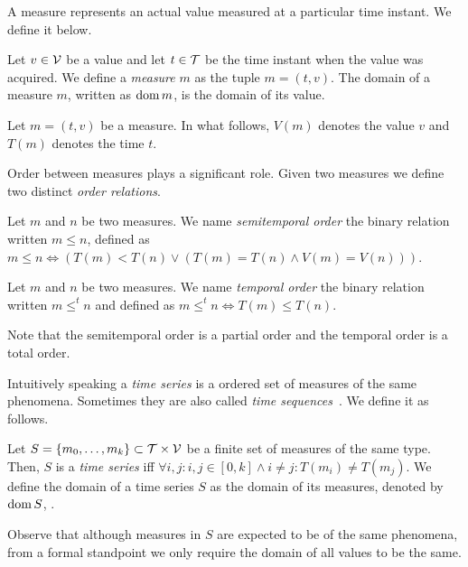 A measure represents an actual value measured at a particular time
instant. We define it below.

\begin{definition}[Measure]
  Let $v\in\cal{V}$ be a value and let $t\in\cal{T}$ be the time
  instant when the value was acquired. We define a \emph{measure} $m$
  as the tuple $m=(t,v)$. The domain of a measure $m$, written as
  $\operatorname{dom} m$, is the domain of its value.
\end{definition}

Let $m = (t,v)$ be a measure. In what follows, $V(m)$ denotes the
value $v$ and $T(m)$ denotes the time $t$.

Order between measures plays a significant role. Given two measures we
define two distinct \emph{order relations}.

\begin{definition}\label{def:semitemporal_order}
  Let $m$ and $n$ be two measures. We name \emph{semitemporal order}
  the binary relation written $m\leq n$, defined as $m\leq n\iff
  (T(m)<T(n) \vee ( T(m)=T(n) \wedge V(m) = V(n) ))$.
\end{definition}

\begin{definition}\label{def:temporal_order}
  Let $m$ and $n$ be two measures. We name \emph{temporal order} the
  binary relation written $m \leq^t n$ and defined as $m \leq^t n \iff
  T(m) \leq T(n)$.
\end{definition}

Note that the semitemporal order is a partial order and the temporal
order is a total order.

Intuitively speaking a \emph{time series} is a ordered set of measures
of the same phenomena.  Sometimes they are also called \emph{time
  sequences}~\cite{last:hetland}. We define it as follows.

\begin{definition}
  \label{def:model:timeseries}
  Let $S = \{m_0,\ldots,m_k\}\subset\cal{T}\times\cal{V}$ be a finite
  set of measures of the same type. Then, $S$ is a \emph{time series}
  iff $\forall i,j: i,j\in[0,k] \wedge i\neq j: T(m_i)\neq T(m_j)$. We
  define the domain of a time series $S$ as the domain of its
  measures, denoted by $\operatorname{dom} S$, .
\end{definition}

Observe that although measures in $S$ are expected to be of the same
phenomena, from a formal standpoint we only require the domain of all
values to be the same.

